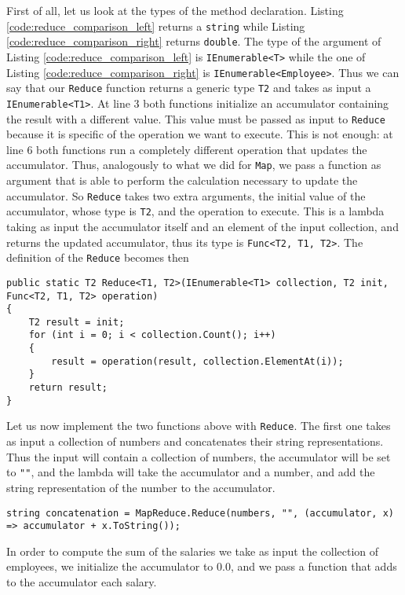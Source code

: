 \noindent
First of all, let us look at the types of the method declaration. Listing \ref{code:reduce_comparison_left} returns a \texttt{string} while Listing  \ref{code:reduce_comparison_right} returns \texttt{double}. The type of the argument of Listing \ref{code:reduce_comparison_left} is \texttt{IEnumerable<T>} while the one of Listing \ref{code:reduce_comparison_right} is \texttt{IEnumerable<Employee>}. Thus we can say that our \texttt{Reduce} function returns a generic type \texttt{T2} and takes as input a \texttt{IEnumerable<T1>}. At line 3 both functions initialize an accumulator containing the result with a different value. This value must be passed as input to \texttt{Reduce} because it is specific of the operation we want to execute. This is not enough: at line 6 both functions run a completely different operation that updates the accumulator. Thus, analogously to what we did for \texttt{Map}, we pass a function as argument that is able to perform the calculation necessary to update the accumulator. So \texttt{Reduce} takes two extra arguments, the initial value of the accumulator, whose type is \texttt{T2}, and the operation to execute. This is a lambda taking as input the accumulator itself and an element of the input collection, and returns the updated accumulator, thus its type is \texttt{Func<T2, T1, T2>}. The definition of the \texttt{Reduce} becomes then

\begin{lstlisting}
public static T2 Reduce<T1, T2>(IEnumerable<T1> collection, T2 init, Func<T2, T1, T2> operation)
{
	T2 result = init;
	for (int i = 0; i < collection.Count(); i++)
	{
		result = operation(result, collection.ElementAt(i));
	}
	return result;
}
\end{lstlisting}

\noindent
Let us now implement the two functions above with \texttt{Reduce}. The first one takes as input a collection of numbers and concatenates their string representations. Thus the input will contain a collection of numbers, the accumulator will be set to \texttt{""}, and the lambda will take the accumulator and a number, and add the string representation of the number to the accumulator.

\begin{lstlisting}
string concatenation = MapReduce.Reduce(numbers, "", (accumulator, x) => accumulator + x.ToString());
\end{lstlisting}

In order to compute the sum of the salaries we take as input the collection of employees, we initialize the accumulator to 0.0, and we pass a function that adds to the accumulator each salary.

